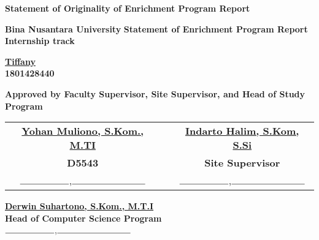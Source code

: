 \renewcommand{\baselinestretch}{1.5}\normalsize
\begin{flushleft}
\textbf{Statement of Originality of Enrichment Program Report}
\end{flushleft}
    \begin{center}
        \textbf{Bina Nusantara University}
		\noindent\makebox[\linewidth]{\rule{\linewidth}{0.3pt}}
        \textbf{Statement of Enrichment Program Report}\\
		\textbf{Internship track}
		\vspace{0.6cm}
		\textbf{\underline{Tiffany}\\1801428440}
		\begin{flushleft}
		\textbf{Approved by Faculty Supervisor, Site Supervisor, and Head of Study Program}
		\end{flushleft}				
		\vfill
		\begin{tabular}{ccc}
		\textbf{\underline{Yohan Muliono, S.Kom., M.TI}} & \hspace{1.5cm} & \textbf{\underline{Indarto Halim, S.Kom, S.Si}}\\
		\textbf{D5543} & & \textbf{Site Supervisor}\\
		$\rule{2cm}{0.15mm}$,$\rule{3cm}{0.15mm}$ & & $\rule{2cm}{0.15mm}$,$\rule{3cm}{0.15mm}$
		\end{tabular}      
        
        \vspace{1cm}
        \begin{center}
        \textbf{\underline{Derwin Suhartono, S.Kom., M.T.I}\\
        Head of Computer Science Program}\\
        $\rule{2cm}{0.15mm}$,$\rule{3cm}{0.15mm}$
        \end{center}
    \end{center}